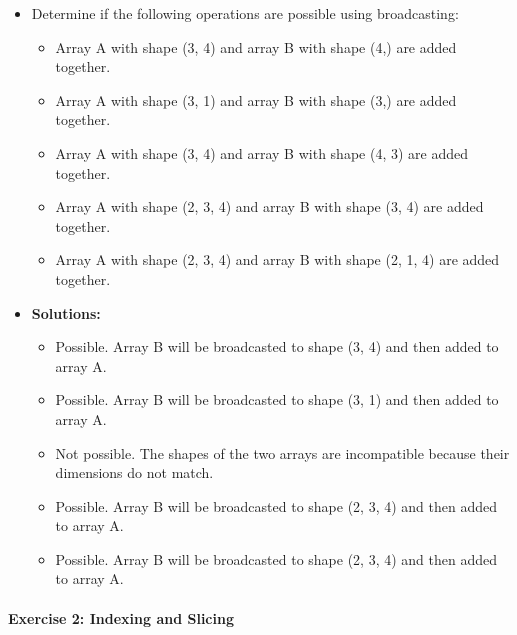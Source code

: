 \documentclass[11pt]{article}
\providecommand{\tightlist}{%
      \setlength{\itemsep}{0pt}\setlength{\parskip}{0pt}}
\begin{document}
\begin{itemize}
\item
  Determine if the following operations are possible using broadcasting:

  \begin{itemize}
  \tightlist
  \item
    Array A with shape (3, 4) and array B with shape (4,) are added
    together.
  \item
    Array A with shape (3, 1) and array B with shape (3,) are added
    together.
  \item
    Array A with shape (3, 4) and array B with shape (4, 3) are added
    together.
  \item
    Array A with shape (2, 3, 4) and array B with shape (3, 4) are added
    together.
  \item
    Array A with shape (2, 3, 4) and array B with shape (2, 1, 4) are
    added together.
  \end{itemize}
\item
  \textbf{Solutions:}

  \begin{itemize}
  \tightlist
  \item
    Possible. Array B will be broadcasted to shape (3, 4) and then added
    to array A.
  \item
    Possible. Array B will be broadcasted to shape (3, 1) and then added
    to array A.
  \item
    Not possible. The shapes of the two arrays are incompatible because
    their dimensions do not match.
  \item
    Possible. Array B will be broadcasted to shape (2, 3, 4) and then
    added to array A.
  \item
    Possible. Array B will be broadcasted to shape (2, 3, 4) and then
    added to array A.
  \end{itemize}
\end{itemize}

\hypertarget{exercise-2-indexing-and-slicing}{%
\paragraph{Exercise 2: Indexing and
Slicing}\label{exercise-2-indexing-and-slicing}}
\end{document}
